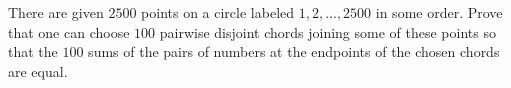 There are given $2500$ points on a circle labeled $1, 2, \ldots, 2500$ in some order. Prove that one can choose $100$ pairwise disjoint chords joining some of these points so that the $100$ sums of the pairs of numbers at the endpoints of the chosen chords are equal.
